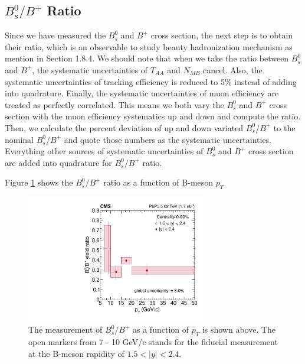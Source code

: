\subsection{$B^0_s/B^{+}$ Ratio}

Since we have measured the $B^0_s$ and $B^+$ cross section, the next step is to obtain their ratio, which is an observable to study beauty hadronization mechanism as mention in Section 1.8.4. We should note that when we take the ratio between $B^0_s$ and $B^+$, the systematic uncertainties of $T_{AA}$ and $N_{MB}$ cancel. Also, the systematic uncertainties of tracking efficiency is reduced to 5\% instead of adding into quadrature. Finally, the systematic uncertainties of muon efficiency are treated as perfectly correlated. This means we both vary the $B^0_s$ and $B^+$ cross section with the muon efficiency systematics up and down and compute the ratio. Then, we calculate the percent deviation of up and down variated $B^0_s/B^+$ to the nominal $B^0_s/B^+$ and quote those numbers as the systematic uncertainties. Everything other sources of systematic uncertainties of $B^0_s$ and $B^+$ cross section are added into quadrature for $B^0_s/B^+$ ratio. 

Figure \ref{BsBPPtDataONLY} shows the $B^0_s/B^+$ ratio as a function of B-meson $p_T$



\begin{figure}[hbtp]
\begin{center}
\includegraphics[width=0.70\textwidth]{Figures/Chapter5/ratio_vsPt_ref0_0.pdf}
\caption{The measurement of $B^0_s/B^+$ as a function of $p_T$ is shown above. The open markers from 7 - 10 GeV/c stands for the fiducial measurement at the B-meson rapidity of $1.5 < |y| < 2.4$.}
\label{BsBPPtDataONLY}
\end{center}
\end{figure}

